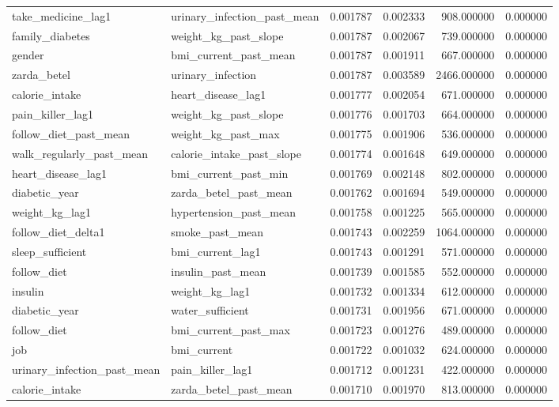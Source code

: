 \begin{longtable}{llrrrr}
take\_medicine\_lag1 & urinary\_infection\_past\_mean & 0.001787 & 0.002333 & 908.000000 & 0.000000 \\
family\_diabetes & weight\_kg\_past\_slope & 0.001787 & 0.002067 & 739.000000 & 0.000000 \\
gender & bmi\_current\_past\_mean & 0.001787 & 0.001911 & 667.000000 & 0.000000 \\
zarda\_betel & urinary\_infection & 0.001787 & 0.003589 & 2466.000000 & 0.000000 \\
calorie\_intake & heart\_disease\_lag1 & 0.001777 & 0.002054 & 671.000000 & 0.000000 \\
pain\_killer\_lag1 & weight\_kg\_past\_slope & 0.001776 & 0.001703 & 664.000000 & 0.000000 \\
follow\_diet\_past\_mean & weight\_kg\_past\_max & 0.001775 & 0.001906 & 536.000000 & 0.000000 \\
walk\_regularly\_past\_mean & calorie\_intake\_past\_slope & 0.001774 & 0.001648 & 649.000000 & 0.000000 \\
heart\_disease\_lag1 & bmi\_current\_past\_min & 0.001769 & 0.002148 & 802.000000 & 0.000000 \\
diabetic\_year & zarda\_betel\_past\_mean & 0.001762 & 0.001694 & 549.000000 & 0.000000 \\
weight\_kg\_lag1 & hypertension\_past\_mean & 0.001758 & 0.001225 & 565.000000 & 0.000000 \\
follow\_diet\_delta1 & smoke\_past\_mean & 0.001743 & 0.002259 & 1064.000000 & 0.000000 \\
sleep\_sufficient & bmi\_current\_lag1 & 0.001743 & 0.001291 & 571.000000 & 0.000000 \\
follow\_diet & insulin\_past\_mean & 0.001739 & 0.001585 & 552.000000 & 0.000000 \\
insulin & weight\_kg\_lag1 & 0.001732 & 0.001334 & 612.000000 & 0.000000 \\
diabetic\_year & water\_sufficient & 0.001731 & 0.001956 & 671.000000 & 0.000000 \\
follow\_diet & bmi\_current\_past\_max & 0.001723 & 0.001276 & 489.000000 & 0.000000 \\
job & bmi\_current & 0.001722 & 0.001032 & 624.000000 & 0.000000 \\
urinary\_infection\_past\_mean & pain\_killer\_lag1 & 0.001712 & 0.001231 & 422.000000 & 0.000000 \\
calorie\_intake & zarda\_betel\_past\_mean & 0.001710 & 0.001970 & 813.000000 & 0.000000 \\

\end{longtable}
